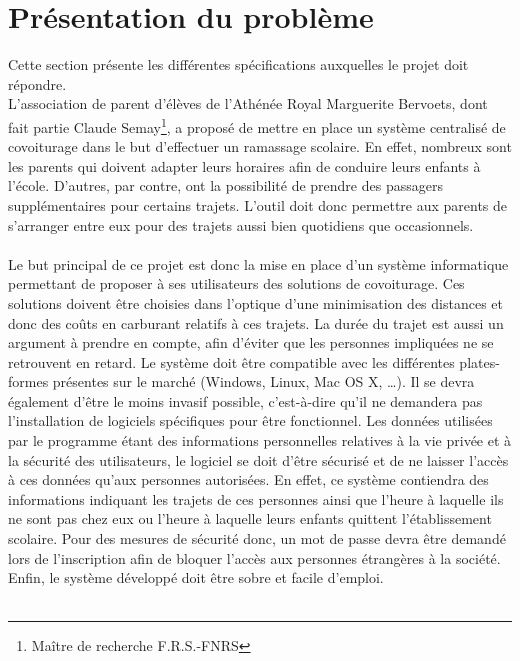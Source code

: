 \documentclass[12pt, a4paper, oneside]{article}
\begin{document}
\section{Présentation du problème}\label{prob}
    Cette section présente les différentes spécifications auxquelles le projet doit répondre.\\
    \indent L'association de parent d'élèves de l'Athénée Royal Marguerite Bervoets, dont fait partie Claude Semay\footnote{Maître de recherche F.R.S.-FNRS}, a proposé de mettre en place un système centralisé de covoiturage dans le but d'effectuer un ramassage scolaire. En effet, nombreux sont les parents qui doivent adapter leurs horaires afin de conduire leurs enfants à l'école. D'autres, par contre, ont la possibilité de prendre des passagers supplémentaires pour certains trajets. L'outil doit donc permettre aux parents de s'arranger entre eux pour des trajets aussi bien quotidiens que occasionnels.\\\\
    \indent Le but principal de ce projet est donc la mise en place d'un système informatique permettant de proposer à ses utilisateurs des solutions de covoiturage. Ces solutions doivent être choisies dans l'optique d'une minimisation des distances et donc des coûts en carburant relatifs à ces trajets. La durée du trajet est aussi un argument à prendre en compte, afin d'éviter que les personnes impliquées ne se retrouvent en retard. Le système doit être compatible avec les différentes plates-formes présentes sur le marché (Windows, Linux, Mac OS X, \dots). Il se devra également d'être le moins invasif possible, c'est-à-dire qu'il ne demandera pas l'installation de logiciels spécifiques pour être fonctionnel. Les données utilisées par le programme étant des informations personnelles relatives à la vie privée et à la sécurité des utilisateurs, le logiciel se doit d'être sécurisé et de ne laisser l'accès à ces données qu'aux personnes autorisées. En effet, ce système contiendra des informations indiquant les trajets de ces personnes ainsi que l'heure à laquelle ils ne sont pas chez eux ou l'heure à laquelle leurs enfants quittent l'établissement scolaire. Pour des mesures de sécurité donc, un mot de passe devra être demandé lors de l'inscription afin de bloquer l'accès aux personnes étrangères à la société. Enfin, le système développé doit être sobre et facile d'emploi.\\\\
\end{document}
